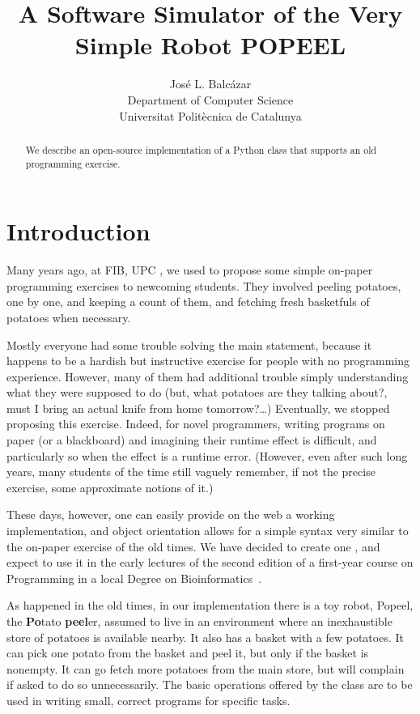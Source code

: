 \documentclass[12pt]{article}
\title{A Software Simulator of the Very Simple Robot POPEEL%
}
\author{Jos\'e L. Balc\'azar \\
{Department of Computer Science} \\
{Universitat Polit\`ecnica de Catalunya}}
\begin{document}
\maketitle

\begin{abstract}
We describe an open-source implementation of a
Python class that supports an old programming
exercise.
\end{abstract}


\section{Introduction}%

Many years ago, at FIB, UPC \cite{FIB}, we used to 
propose some simple on-paper programming exercises 
to newcoming students. They involved peeling potatoes, 
one by one, and keeping a count of them, and fetching 
fresh basketfuls of potatoes when necessary. 

Mostly everyone had some trouble solving the main
statement, because it happens to be a hardish but 
instructive exercise for people with no programming 
experience. However, many of them had additional 
trouble simply understanding what they were supposed 
to do \cite{PBblog} (but, what potatoes are they 
talking about?, must I bring an actual knife from 
home tomorrow?\dots) Eventually, we stopped proposing 
this exercise. Indeed, for novel programmers, writing 
programs on paper (or a blackboard) and imagining 
their runtime effect is difficult, and particularly so 
when the effect is a runtime error.
(However, even after such long years,
many students of the time still vaguely
remember, if not the precise exercise, some approximate
notions of it.)

These days, however, one can easily provide on the 
web a working implementation, and object orientation
allows for a simple syntax very similar to the 
on-paper exercise of the old times. We have decided
to create one \cite{Popeel}, and expect to use it in the early
lectures of the second edition of a first-year
course on Programming \cite{mireport} in a local 
Degree on Bioinformatics~\cite{BDBI}.

As happened in the old times, in our implementation
there is a toy robot, Popeel, the 
{\bf Po}tato {\bf peel}er, assumed to live in an 
environment where an inexhaustible store of potatoes 
is available nearby. It also has a basket with a few 
potatoes. It can pick one potato from the basket and 
peel it, but only if the basket is nonempty. It can go 
fetch more potatoes from the main store, but will complain 
if asked to do so unnecessarily. The basic operations
offered by the class are to be used in writing small,
correct programs for specific tasks.
\end{document}
